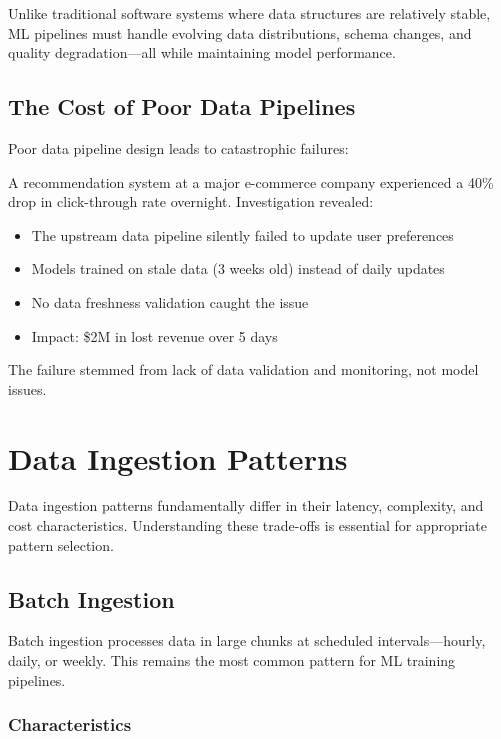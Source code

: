 Unlike traditional software systems where data structures are relatively stable, ML pipelines must handle evolving data distributions, schema changes, and quality degradation—all while maintaining model performance.

\subsection{The Cost of Poor Data Pipelines}

Poor data pipeline design leads to catastrophic failures:

\begin{example}
A recommendation system at a major e-commerce company experienced a 40\% drop in click-through rate overnight. Investigation revealed:

\begin{itemize}
    \item The upstream data pipeline silently failed to update user preferences
    \item Models trained on stale data (3 weeks old) instead of daily updates
    \item No data freshness validation caught the issue
    \item Impact: \$2M in lost revenue over 5 days
\end{itemize}

The failure stemmed from lack of data validation and monitoring, not model issues.
\end{example}

\section{Data Ingestion Patterns}

Data ingestion patterns fundamentally differ in their latency, complexity, and cost characteristics. Understanding these trade-offs is essential for appropriate pattern selection.

\subsection{Batch Ingestion}

Batch ingestion processes data in large chunks at scheduled intervals—hourly, daily, or weekly. This remains the most common pattern for ML training pipelines.

\subsubsection{Characteristics}


